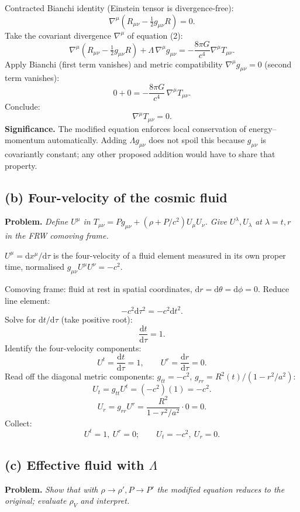 \documentclass[11pt]{article}
\newcommand{\de}{\mathrm{d}}
\begin{document}
Contracted Bianchi identity (Einstein tensor is divergence-free):
\[
\nabla^\mu\!\left(R_{\mu\nu} - \tfrac{1}{2}g_{\mu\nu}R\right) = 0.
\]
Take the covariant divergence $\nabla^\mu$ of equation (2):
\[
\nabla^\mu\!\left(R_{\mu\nu} - \tfrac{1}{2}g_{\mu\nu}R\right) + \Lambda\,\nabla^\mu g_{\mu\nu} = -\frac{8\pi G}{c^4}\nabla^\mu T_{\mu\nu}.
\]
Apply Bianchi (first term vanishes) and metric compatibility $\nabla^\mu g_{\mu\nu}=0$ (second term vanishes):
\[
0 + 0 = -\frac{8\pi G}{c^4}\,\nabla^\mu T_{\mu\nu}.
\]
Conclude:
\[
\nabla^\mu T_{\mu\nu} = 0.
\]
\textbf{Significance.} The modified equation enforces local conservation of energy--momentum automatically. Adding $\Lambda g_{\mu\nu}$ does not spoil this because $g_{\mu\nu}$ is covariantly constant; any other proposed addition would have to share that property.

\subsection*{(b) Four-velocity of the cosmic fluid}

\textbf{Problem.} \emph{Define $U^\mu$ in $T_{\mu\nu} = P g_{\mu\nu}+(\rho + P/c^2)U_\mu U_\nu$. Give $U^\lambda, U_\lambda$ at $\lambda=t,r$ in the FRW comoving frame.}

$U^\mu = \de x^\mu/\de\tau$ is the four-velocity of a fluid element measured in its own proper time, normalised $g_{\mu\nu}U^\mu U^\nu = -c^2$.

Comoving frame: fluid at rest in spatial coordinates, $\de r = \de\theta = \de\phi = 0$. Reduce line element:
\[
-c^2\de\tau^2 = -c^2\de t^2.
\]
Solve for $\de t/\de\tau$ (take positive root):
\[
\frac{\de t}{\de\tau} = 1.
\]
Identify the four-velocity components:
\[
U^t = \frac{\de t}{\de\tau} = 1,\qquad U^r = \frac{\de r}{\de\tau} = 0.
\]
Read off the diagonal metric components: $g_{tt} = -c^2$, $g_{rr} = R^2(t)/(1-r^2/a^2)$:
\[
U_t = g_{tt}U^t = (-c^2)(1) = -c^2.
\]
\[
U_r = g_{rr}U^r = \frac{R^2}{1-r^2/a^2}\cdot 0 = 0.
\]
Collect:
\[
\boxed{\;U^t = 1,\ U^r = 0;\qquad U_t = -c^2,\ U_r = 0.\;}
\]

\subsection*{(c) Effective fluid with $\Lambda$}

\textbf{Problem.} \emph{Show that with $\rho\to\rho', P\to P'$ the modified equation reduces to the original; evaluate $\rho_V$ and interpret.}
\end{document}
